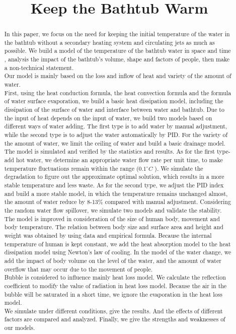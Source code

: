 \documentclass{mcmthesis}
\title{}
\date{}
\begin{document}
\begin{abstract}%


\title{Keep the Bathtub Warm}
\indent In this paper, we focus on the need for keeping the initial temperature of the water in the bathtub without a secondary heating system and circulating jets as much as possible. We build a model of the temperature of the bathtub water in space and time , analysis the impact of the bathtub's volume, shape and factors of people, then make a non-technical statement.\\
\indent
Our model is mainly based on the loss and inflow of heat and variety of the amount of water.\\
\indent
First, using the heat conduction formula, the heat convection formula and the formula of water surface evaporation, we build a basic heat dissipation model, including the dissipation of the surface of water and interface between water and bathtub. Due to the input of heat depends on the input of water, we build two models based on different ways of water adding. The first type is to add water by manual adjustment, while the second type is to adjust the water automatically by PID. For the variety of the amount of water, we limit the ceiling of water and build a basic drainage model.\\
\indent
The model is simulated and verified by the statistics and results. As for the first type-add hot water, we determine an appropriate water flow rate per unit time, to make temperature fluctuations remain within the range ($0.1^{\circ}C$ ). We simulate the degradation to figure out the approximate optimal solution, which results in a more stable temperature and less waste. As for the second type, we adjust the PID index and build a more stable model, in which the temperature remains unchanged almost, the amount of water reduce by 8-13\% compared with manual adjustment. Considering the random water flow spillover, we simulate two models and validate the stability.\\
\indent
The model is improved in consideration of the size of human body, movement and body temperature. The relation between body size and surface area and height and weight was obtained by using data and empirical formula. Because the internal temperature of human is kept constant, we add the heat absorption model to the heat dissipation model using Newton's law of cooling. In the model of the water change, we add the impact of body volume on the level of the water, and the amount of water overflow that may occur due to the movement of people.\\
\indent
Bubble is considered to influence mainly heat loss model. We calculate the reflection coefficient to modify the value of radiation in heat loss model. Because the air in the bubble will be saturated in a short time, we ignore the evaporation in the heat loss model.\\
\indent
We simulate under different conditions, give the results. And the effects of different factors are compared and analyzed. Finally, we give the strengths and weaknesses of our models. \\



\end{abstract}
\end{document}
